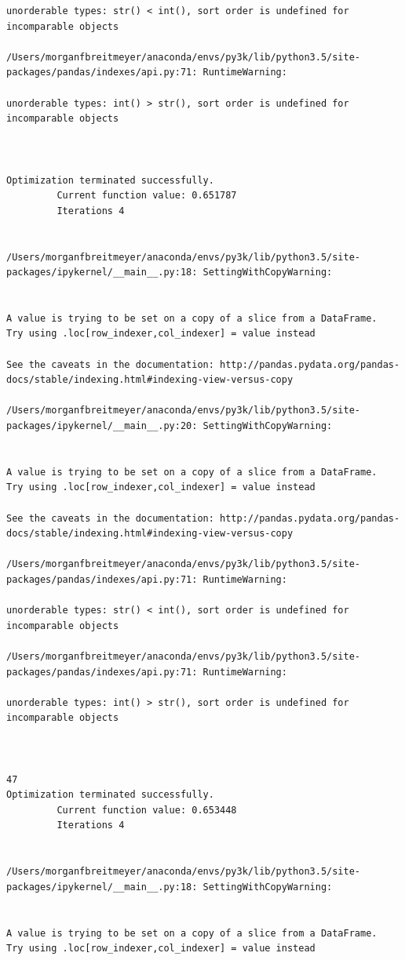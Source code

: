 \begin{lstlisting}
unorderable types: str() < int(), sort order is undefined for incomparable objects

/Users/morganfbreitmeyer/anaconda/envs/py3k/lib/python3.5/site-packages/pandas/indexes/api.py:71: RuntimeWarning:

unorderable types: int() > str(), sort order is undefined for incomparable objects



Optimization terminated successfully.
         Current function value: 0.651787
         Iterations 4


/Users/morganfbreitmeyer/anaconda/envs/py3k/lib/python3.5/site-packages/ipykernel/__main__.py:18: SettingWithCopyWarning:


A value is trying to be set on a copy of a slice from a DataFrame.
Try using .loc[row_indexer,col_indexer] = value instead

See the caveats in the documentation: http://pandas.pydata.org/pandas-docs/stable/indexing.html#indexing-view-versus-copy

/Users/morganfbreitmeyer/anaconda/envs/py3k/lib/python3.5/site-packages/ipykernel/__main__.py:20: SettingWithCopyWarning:


A value is trying to be set on a copy of a slice from a DataFrame.
Try using .loc[row_indexer,col_indexer] = value instead

See the caveats in the documentation: http://pandas.pydata.org/pandas-docs/stable/indexing.html#indexing-view-versus-copy

/Users/morganfbreitmeyer/anaconda/envs/py3k/lib/python3.5/site-packages/pandas/indexes/api.py:71: RuntimeWarning:

unorderable types: str() < int(), sort order is undefined for incomparable objects

/Users/morganfbreitmeyer/anaconda/envs/py3k/lib/python3.5/site-packages/pandas/indexes/api.py:71: RuntimeWarning:

unorderable types: int() > str(), sort order is undefined for incomparable objects



47
Optimization terminated successfully.
         Current function value: 0.653448
         Iterations 4


/Users/morganfbreitmeyer/anaconda/envs/py3k/lib/python3.5/site-packages/ipykernel/__main__.py:18: SettingWithCopyWarning:


A value is trying to be set on a copy of a slice from a DataFrame.
Try using .loc[row_indexer,col_indexer] = value instead


\end{lstlisting}
